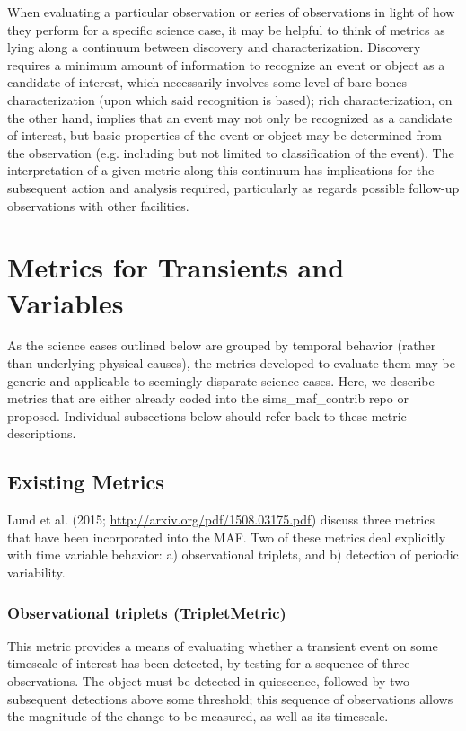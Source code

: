 When evaluating a particular observation or series of observations in light of how they perform for a specific science case, it may be helpful to think of metrics as lying along a continuum between discovery and characterization. Discovery requires a minimum amount of information to recognize an event or object as a candidate of interest, which necessarily involves some level of bare-bones characterization (upon which said recognition is based); rich characterization, on the other hand, implies that an event may not only be recognized as a candidate of interest, but basic properties of the event or object may be determined from the observation (e.g. including but not limited to classification of the event). The interpretation of a given metric along this continuum has implications for the subsequent action and analysis required, particularly as regards possible follow-up observations with other facilities. 


\section{Metrics for Transients and Variables}

As the science cases outlined below are grouped by temporal behavior (rather than underlying physical causes), the metrics developed to evaluate them may be generic and applicable to seemingly disparate science cases. Here, we describe metrics that are either already coded into the sims_maf_contrib repo or proposed. Individual subsections below should refer back to these metric descriptions.  


\subsection{Existing Metrics}

Lund et al. (2015; \url{http://arxiv.org/pdf/1508.03175.pdf}) discuss three metrics that have been incorporated into the MAF. Two of these metrics deal explicitly with time variable behavior: a) observational triplets, and b) detection of periodic variability. 

\subsubsection{Observational triplets (TripletMetric)}

This metric provides a means of evaluating whether a transient event on some timescale of interest has been detected, by testing for a sequence of three observations. The object must be detected in quiescence, followed by two subsequent detections above some threshold; this sequence of observations allows the magnitude of the change to be measured, as well as its timescale. 

